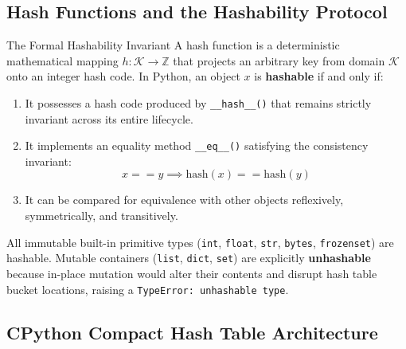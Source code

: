 \subsection{Hash Functions and the Hashability Protocol}

\begin{definitionbox}{The Formal Hashability Invariant}
 
A hash function is a deterministic mathematical mapping $h: \mathcal{K} \to \mathbb{Z}$ that projects an arbitrary key from domain $\mathcal{K}$ onto an integer hash code.
In Python, an object $x$ is \textbf{hashable} if and only if:
\begin{enumerate}
    \item It possesses a hash code produced by \texttt{\_\_hash\_\_()} that remains strictly invariant across its entire lifecycle.
    \item It implements an equality method \texttt{\_\_eq\_\_()} satisfying the consistency invariant:
    \begin{equation}
    x == y \implies \text{hash}(x) == \text{hash}(y)
    \end{equation}
    \item It can be compared for equivalence with other objects reflexively, symmetrically, and transitively.
\end{enumerate}
All immutable built-in primitive types (\texttt{int}, \texttt{float}, \texttt{str}, \texttt{bytes}, \texttt{frozenset}) are hashable. Mutable containers (\texttt{list}, \texttt{dict}, \texttt{set}) are explicitly \textbf{unhashable} because in-place mutation would alter their contents and disrupt hash table bucket locations, raising a \texttt{TypeError: unhashable type}.
\end{definitionbox}

\subsection{CPython Compact Hash Table Architecture}

